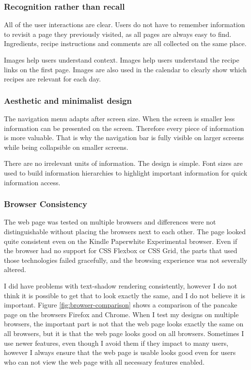 \documentclass[a4paper]{scrartcl}
\begin{document}
\subsubsection{Recognition rather than recall}
All of the user interactions are clear. Users do not have to remember information to revisit a page they previously visited, as all pages are always easy to find. Ingredients, recipe instructions and comments are all collected on the same place.

Images help users understand context. Images help users understand the recipe links on the first page. Images are also used in the calendar to clearly show which recipes are relevant for each day.

\subsubsection{Aesthetic and minimalist design}
The navigation menu adapts after screen size. When the screen is smaller less information can be presented on the screen. Therefore every piece of information is more valuable. That is why the navigation bar is fully visible on larger screens while being collapsible on smaller screens.

There are no irrelevant units of information. The design is simple. Font sizes are used to build information hierarchies to highlight important information for quick information access.

\subsubsection{Browser Consistency}
The web page was tested on multiple browsers and differences were not distinguishable without placing the browsers next to each other. The page looked quite consistent even on the Kindle Paperwhite Experimental browser. Even if the browser had no support for CSS Flexbox or CSS Grid, the parts that used those technologies failed gracefully, and the browsing experience was not severally altered.

I did have problems with text-shadow rendering consistently, however I do not think it is possible to get that to look exactly the same, and I do not believe it is important. Figure \ref{fig:browser-comparison} shows a comparison of the pancake page on the browsers Firefox and Chrome. When I test my designs on multiple browsers, the important part is not that the web page looks exactly the same on all browsers, but it is that the web page looks good on all browsers. Sometimes I use newer features, even though I avoid them if they impact to many users, however I always ensure that the web page is usable looks good even for users who can not view the web page with all necessary features enabled.
\end{document}
